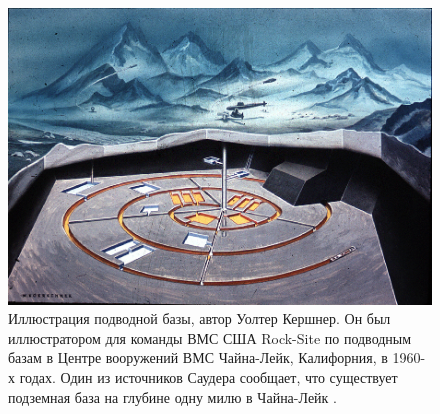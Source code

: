 \documentclass[10pt,twocolumn,letterpaper]{article}
\begin{document}
\begin{figure}[t]
\begin{center}
   \includegraphics[width=1\linewidth]{undersea.jpg}
\end{center}
   \caption{Иллюстрация подводной базы, автор Уолтер Кершнер. Он был иллюстратором для команды ВМС США Rock-Site по подводным базам в Центре вооружений ВМС Чайна-Лейк, Калифорния, в 1960-х годах. Один из источников Саудера сообщает, что существует подземная база на глубине одну милю в Чайна-Лейк \cite{22,23}.}
\label{fig:5}
\label{fig:onecol}
\end{figure}
\end{document}
